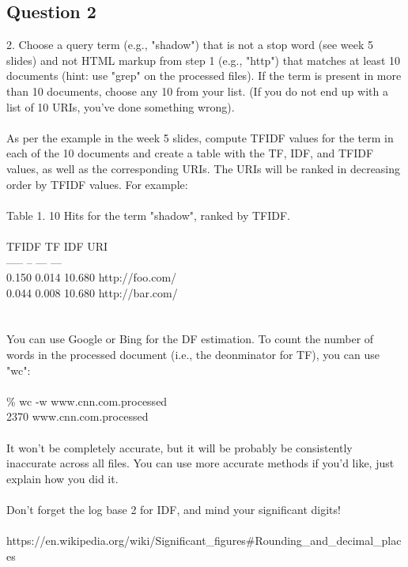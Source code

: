 \documentclass[10pt,letterpaper]{article}
\begin{document}
\subsection{Question 2}
2.  Choose a query term (e.g., "shadow") that is not a stop word
(see week 5 slides) and not HTML markup from step 1 (e.g., "http")
that matches at least 10 documents (hint: use "grep" on the processed
files).  If the term is present in more than 10 documents, choose
any 10 from your list.  (If you do not end up with a list of 10
URIs, you've done something wrong).\\
\\
As per the example in the week 5 slides, compute TFIDF values for
the term in each of the 10 documents and create a table with the
TF, IDF, and TFIDF values, as well as the corresponding URIs.  The
URIs will be ranked in decreasing order by TFIDF values.  For
example:\\
\\
Table 1. 10 Hits for the term "shadow", ranked by TFIDF.\\
\\
TFIDF	TF	IDF	URI\\
-----	--	---	---\\
0.150	0.014	10.680	http://foo.com/\\
0.044	0.008	10.680	http://bar.com/\\
\\
\\
You can use Google or Bing for the DF estimation.  To count the
number of words in the processed document (i.e., the deonminator
for TF), you can use "wc":\\
\\
\% wc -w www.cnn.com.processed\\
    2370 www.cnn.com.processed\\
\\
It won't be completely accurate, but it will be probably be
consistently inaccurate across all files.  You can use more 
accurate methods if you'd like, just explain how you did it.\\  
\\
Don't forget the log base 2 for IDF, and mind your significant
digits!\\
\\
https://en.wikipedia.org/wiki/Significant\_figures\#Rounding\_and\_decimal\_places\\
\\
\end{document}
